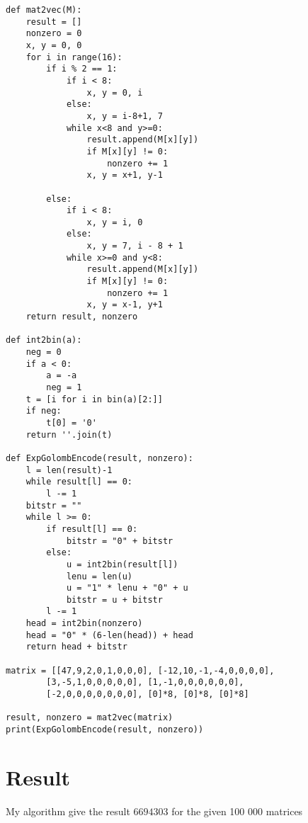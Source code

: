 \documentclass[main.tex]{subfiles}
\begin{document}
\begin{lstlisting}
def mat2vec(M):
    result = []
    nonzero = 0
    x, y = 0, 0
    for i in range(16):
        if i % 2 == 1:
            if i < 8:
                x, y = 0, i
            else:
                x, y = i-8+1, 7
            while x<8 and y>=0:
                result.append(M[x][y])
                if M[x][y] != 0:
                    nonzero += 1
                x, y = x+1, y-1
                
        else:
            if i < 8:
                x, y = i, 0
            else:
                x, y = 7, i - 8 + 1
            while x>=0 and y<8:
                result.append(M[x][y])
                if M[x][y] != 0:
                    nonzero += 1
                x, y = x-1, y+1
    return result, nonzero

def int2bin(a):
    neg = 0
    if a < 0:
        a = -a
        neg = 1
    t = [i for i in bin(a)[2:]]
    if neg:
        t[0] = '0'
    return ''.join(t)

def ExpGolombEncode(result, nonzero):
    l = len(result)-1
    while result[l] == 0:
        l -= 1
    bitstr = ""
    while l >= 0:
        if result[l] == 0:
            bitstr = "0" + bitstr
        else:
            u = int2bin(result[l])
            lenu = len(u)
            u = "1" * lenu + "0" + u
            bitstr = u + bitstr
        l -= 1
    head = int2bin(nonzero)
    head = "0" * (6-len(head)) + head
    return head + bitstr

matrix = [[47,9,2,0,1,0,0,0], [-12,10,-1,-4,0,0,0,0],
        [3,-5,1,0,0,0,0,0], [1,-1,0,0,0,0,0,0],
        [-2,0,0,0,0,0,0,0], [0]*8, [0]*8, [0]*8]

result, nonzero = mat2vec(matrix)
print(ExpGolombEncode(result, nonzero))
\end{lstlisting}

\section{Result}

My algorithm give the result $6694303$ for the given 100 000 matrices
\end{document}
